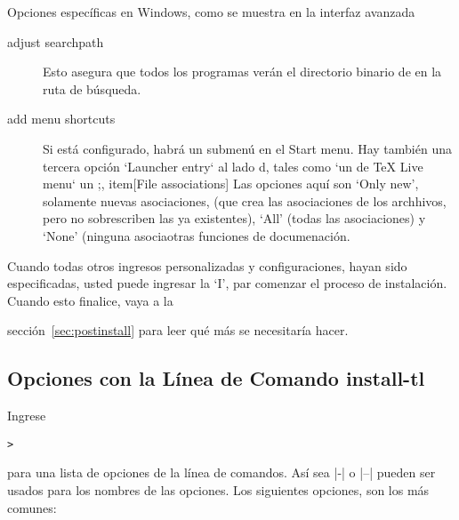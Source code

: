 \documentclass{article}
\begin{document}
Opciones específicas en Windows, como se muestra en la interfaz avanzada \GUI{}

\begin{description}
\item[adjust searchpath] Esto asegura que todos los programas verán el directorio binario de \TL{} en la ruta de búsqueda. 

\item[add menu shortcuts] Si está configurado, habrá un submenú \TL{} en el Start menu. Hay también una tercera opción `Launcher entry` al lado d,
 tales como  `un \GUI{} de TeX Live menu` un
 ;, item[File associations] Las opciones aquí son `Only new', solamente nuevas asociaciones, (que crea las asociaciones de los archhivos, pero no sobrescriben las ya existentes), `All' (todas las asociaciones) y `None' (ninguna
asociaotras funciones de documenación.


\end{description}

Cuando todas otros ingresos personalizadas y configuraciones, hayan
sido especificadas, usted puede ingresar la `I', par comenzar el
proceso de instalación.  Cuando esto finalice, vaya a la

sección~\ref{sec:postinstall} para leer qué más se necesitaría hacer. 

\subsection{Opciones con la Línea de Comando install-tl}
\label{sec:cmdline}


Ingrese 
\begin{alltt}

	> 
\end{alltt}
para una lista de opciones de la línea de comandos. Así sea |-| o |--|
pueden ser usados para los nombres de las opciones. Los
siguientes opciones, son los más comunes:

\ 
\end{document}
